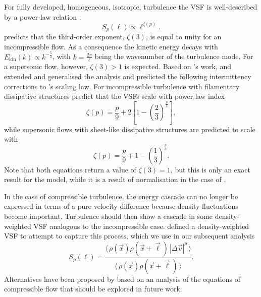 For fully developed, homogeneous, isotropic, turbulence the VSF is well-described by a power-law relation \citep{Kolmogorov1941,She1994,Boldyrev2002}:
\begin{equation}
	\mathit{S}_p (\ell) \propto \ell^{\zeta(p)}.
	\label{equ:method:propto_zeta}
\end{equation}
%
\citet{Kolmogorov1941} predicts that the third-order exponent, $\zeta(3)$, is equal to unity for an incompressible flow.
As a consequence the kinetic energy decays with $E_{\mathrm{kin}}(k) \propto k^{-\frac{5}{3}}$, with $k = \frac{2 \pi}{\ell}$ being the wavenumber of the turbulence mode.
For a supersonic flow, however, $\zeta(3) >1$ is expected.
Based on \citeauthor{Kolmogorov1941}'s work, \citet{She1994} and \citet{Boldyrev2002} extended and generalised the analysis and predicted the following intermittency corrections to \citeauthor{Kolmogorov1941}'s scaling law.
For incompressible turbulence with filamentary dissipative structures \citet{She1994} predict that
the VSFs scale with power law index
\begin{equation}
	\zeta(p) = \frac{p}{9} + 2 \left[ 1 - \left( \frac{2}{3} \right)^{\frac{p}{3}} \right] ,
	\label{equ:method:she}
\end{equation}
while supersonic flows with sheet-like dissipative structures are predicted to scale with \citep{Boldyrev2002}
\begin{equation}
	\zeta(p) = \frac{p}{9} + 1 - \left( \frac{1}{3} \right)^{\frac{p}{3}}.
	\label{equ:method:boldyrev}
\end{equation}
\noindent
Note that both equations return a value of $\zeta(3) =1$, but this is only an exact result for the \citeauthor{She1994} model, while it is a result of normalisation in the case of \citeauthor{Boldyrev2002}. 

In the case of compressible turbulence, the energy cascade can no longer be expressed in terms of a pure velocity difference because density fluctuations become important.
Turbulence should then show a cascade in some density-weighted VSF analogous to the incompressible case.
\citet{Padoan2016a} defined a density-weighted VSF to attempt to capture this process, which we use in our subsequent analysis
\begin{equation}
	{S}_p (\ell) = \frac{\langle \, \rho(\vec{x}) \rho(\vec{x}+\vec{\ell}) \, |\Delta \vec{v}|^p  \, \rangle}{\langle  \, \rho(\vec{x}) \rho(\vec{x}+\vec{\ell}) \, \rangle}.
	\label{equ:method:def_vsf_dw}
\end{equation}
Alternatives have been proposed by \citet{Kritsuk2013a} based on an analysis of the equations of compressible flow that should be explored in future work.

